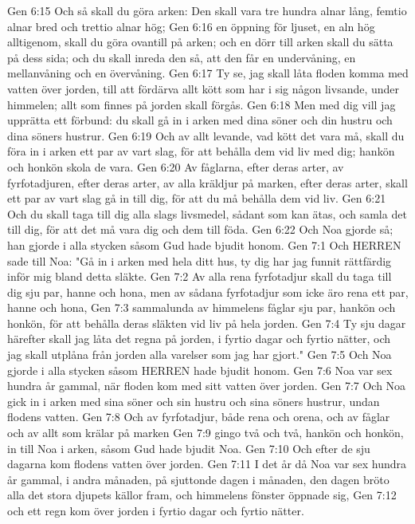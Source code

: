 Gen 6:15  Och så skall du göra arken: Den skall vara tre hundra alnar lång, femtio alnar bred och trettio alnar hög;
Gen 6:16  en öppning för ljuset, en aln hög alltigenom, skall du göra ovantill på arken; och en dörr till arken skall du sätta på dess sida; och du skall inreda den så, att den får en undervåning, en mellanvåning och en övervåning.
Gen 6:17  Ty se, jag skall låta floden komma med vatten över jorden, till att fördärva allt kött som har i sig någon livsande, under himmelen; allt som finnes på jorden skall förgås.
Gen 6:18  Men med dig vill jag upprätta ett förbund: du skall gå in i arken med dina söner och din hustru och dina söners hustrur.
Gen 6:19  Och av allt levande, vad kött det vara må, skall du föra in i arken ett par av vart slag, för att behålla dem vid liv med dig; hankön och honkön skola de vara.
Gen 6:20  Av fåglarna, efter deras arter, av fyrfotadjuren, efter deras arter, av alla kräldjur på marken, efter deras arter, skall ett par av vart slag gå in till dig, för att du må behålla dem vid liv.
Gen 6:21  Och du skall taga till dig alla slags livsmedel, sådant som kan ätas, och samla det till dig, för att det må vara dig och dem till föda.
Gen 6:22  Och Noa gjorde så; han gjorde i alla stycken såsom Gud hade bjudit honom.
Gen 7:1  Och HERREN sade till Noa: "Gå in i arken med hela ditt hus, ty dig har jag funnit rättfärdig inför mig bland detta släkte.
Gen 7:2  Av alla rena fyrfotadjur skall du taga till dig sju par, hanne och hona, men av sådana fyrfotadjur som icke äro rena ett par, hanne och hona,
Gen 7:3  sammalunda av himmelens fåglar sju par, hankön och honkön, för att behålla deras släkten vid liv på hela jorden.
Gen 7:4  Ty sju dagar härefter skall jag låta det regna på jorden, i fyrtio dagar och fyrtio nätter, och jag skall utplåna från jorden alla varelser som jag har gjort."
Gen 7:5  Och Noa gjorde i alla stycken såsom HERREN hade bjudit honom.
Gen 7:6  Noa var sex hundra år gammal, när floden kom med sitt vatten över jorden.
Gen 7:7  Och Noa gick in i arken med sina söner och sin hustru och sina söners hustrur, undan flodens vatten.
Gen 7:8  Och av fyrfotadjur, både rena och orena, och av fåglar och av allt som krälar på marken
Gen 7:9  gingo två och två, hankön och honkön, in till Noa i arken, såsom Gud hade bjudit Noa.
Gen 7:10  Och efter de sju dagarna kom flodens vatten över jorden.
Gen 7:11  I det år då Noa var sex hundra år gammal, i andra månaden, på sjuttonde dagen i månaden, den dagen bröto alla det stora djupets källor fram, och himmelens fönster öppnade sig,
Gen 7:12  och ett regn kom över jorden i fyrtio dagar och fyrtio nätter.
